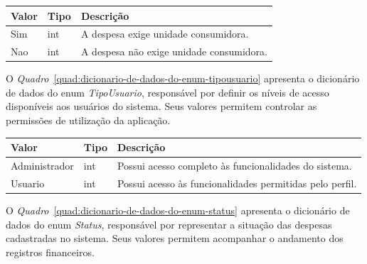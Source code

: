 \begin{quadro}[H]
\caption[Dicionário de dados do enum SolicitaUC]{Dicionário de dados do enum SolicitaUC}
\label{quad:dicionario-de-dados-do-enum-solicitauc}

\begin{tabular}{|p{}|p{}|p{}|}
\hline
\textbf{Valor} & \textbf{Tipo} & \textbf{Descrição} \\ 
\hline
Sim & int & A despesa exige unidade consumidora. \\ 
\hline
Nao & int & A despesa não exige unidade consumidora. \\ 
\hline
\end{tabular}


\end{quadro}



O \textit{Quadro}~\ref{quad:dicionario-de-dados-do-enum-tipousuario} apresenta o dicionário de dados do enum \textit{TipoUsuario}, responsável por definir os níveis de acesso disponíveis aos usuários do sistema. Seus valores permitem controlar as permissões de utilização da aplicação.

\begin{quadro}[H]
\caption[Dicionário de dados do enum TipoUsuario]{Dicionário de dados do enum TipoUsuario}
\label{quad:dicionario-de-dados-do-enum-tipousuario}

\begin{tabular}{|p{}|p{}|p{}|}
\hline
\textbf{Valor} & \textbf{Tipo} & \textbf{Descrição} \\ 
\hline
Administrador & int & Possui acesso completo às funcionalidades do sistema. \\ 
\hline
Usuario & int & Possui acesso às funcionalidades permitidas pelo perfil. \\ 
\hline
\end{tabular}


\end{quadro}



O \textit{Quadro}~\ref{quad:dicionario-de-dados-do-enum-status} apresenta o dicionário de dados do enum \textit{Status}, responsável por representar a situação das despesas cadastradas no sistema. Seus valores permitem acompanhar o andamento dos registros financeiros.

